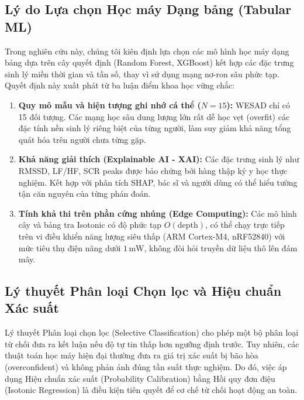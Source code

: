 \documentclass[conference]{IEEEtran}
\begin{document}
\subsection{Lý do Lựa chọn Học máy Dạng bảng (Tabular ML)}
Trong nghiên cứu này, chúng tôi kiên định lựa chọn các mô hình học máy dạng bảng dựa trên cây quyết định (Random Forest, XGBoost) kết hợp các đặc trưng sinh lý miền thời gian và tần số, thay vì sử dụng mạng nơ-ron sâu phức tạp. Quyết định này xuất phát từ ba luận điểm khoa học vững chắc:
\begin{enumerate}
    \item \textbf{Quy mô mẫu và hiện tượng ghi nhớ cá thể ($N=15$):} WESAD chỉ có 15 đối tượng. Các mạng học sâu dung lượng lớn rất dễ học vẹt (overfit) các đặc tính nền sinh lý riêng biệt của từng người, làm suy giảm khả năng tổng quát hóa trên người chưa từng gặp.
    \item \textbf{Khả năng giải thích (Explainable AI - XAI):} Các đặc trưng sinh lý như RMSSD, LF/HF, SCR peaks được bảo chứng bởi hàng thập kỷ y học thực nghiệm. Kết hợp với phân tích SHAP, bác sĩ và người dùng có thể hiểu tường tận căn nguyên của từng phán đoán.
    \item \textbf{Tính khả thi trên phần cứng nhúng (Edge Computing):} Các mô hình cây và bảng tra Isotonic có độ phức tạp $O(\text{depth})$, có thể chạy trực tiếp trên vi điều khiển năng lượng siêu thấp (ARM Cortex-M4, nRF52840) với mức tiêu thụ điện năng dưới $1\,\text{mW}$, không đòi hỏi truyền dữ liệu thô lên đám mây.
\end{enumerate}

\subsection{Lý thuyết Phân loại Chọn lọc và Hiệu chuẩn Xác suất}
Lý thuyết Phân loại chọn lọc (Selective Classification) \cite{geifman2017selective} cho phép một bộ phân loại từ chối đưa ra kết luận nếu độ tự tin thấp hơn ngưỡng định trước. Tuy nhiên, các thuật toán học máy hiện đại thường đưa ra giá trị xác suất bị bão hòa (overconfident) và không phản ánh đúng tần suất thực nghiệm. Do đó, việc áp dụng Hiệu chuẩn xác suất (Probability Calibration) bằng Hồi quy đơn điệu (Isotonic Regression) \cite{niculescu2005predicting} là điều kiện tiên quyết để cơ chế từ chối hoạt động an toàn.

\end{document}
